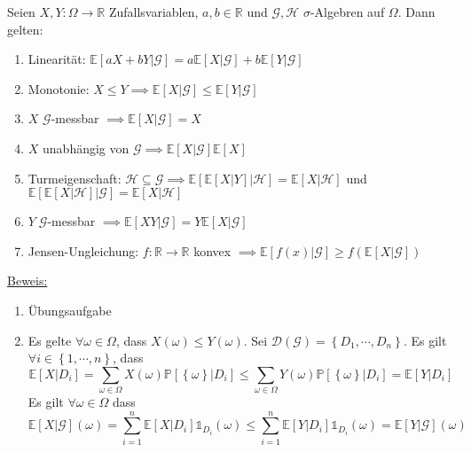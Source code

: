 Seien $ X, Y : \Omega  \to \mathbb{R} $ Zufallsvariablen, $ a,b \in \mathbb{R} $ und $ \mathcal{G}, \mathcal{H}  $ $\sigma$-Algebren auf 
$ \Omega  $. Dann gelten:
\begin{enumerate}[label=\alph*)]
	\item Linearität: $ \mathbb{E} \left[ aX + bY | \mathcal{G} \right] = a \mathbb{E} \left[ X | \mathcal{G} \right] + b \mathbb{E} \left[ Y | \mathcal{G}\right] $ 
	\item Monotonie: $ X \leq Y \implies \mathbb{E} \left[ X | \mathcal{G} \right] \leq \mathbb{E} \left[ Y | \mathcal{G} \right] $ 
	\item $ X  $ $ \mathcal{G}$-messbar $ \implies \mathbb{E} \left[ X | \mathcal{G} \right] = X $  
	\item $ X $ unabhängig von $ \mathcal{G}  \implies \mathbb{E} \left[ X  | \mathcal{G} \right] \mathbb{E} \left[ X \right]$ 
	\item Turmeigenschaft: $ \mathcal{H} \subseteq \mathcal{G} \implies \mathbb{E} \left[ \mathbb{E} \left[ X | Y \right] | \mathcal{H} \right] = \mathbb{E} \left[ X | \mathcal{H} \right] $ und $ \mathbb{E} \left[ \mathbb{E} \left[ X | \mathcal{H} \right]| \mathcal{G} \right] = \mathbb{E} \left[ X | \mathcal{H} \right] $ 
	\item $ Y \; \mathcal{G}$-messbar $ \implies \mathbb{E} \left[ X Y | \mathcal{G} \right] = Y \mathbb{E} \left[ X | \mathcal{G} \right] $
	\item Jensen-Ungleichung: $ f : \mathbb{R} \to \mathbb{R}  $ konvex $ \implies \mathbb{E} \left[ f (x) | \mathcal{G} \right] \geq 
		f \left( \mathbb{E} \left[ X | \mathcal{G} \right] \right)$ 
\end{enumerate}

\underline{Beweis:} \begin{enumerate}[label=\alph*)]
	\item Übungsaufgabe
	\item Es gelte $ \forall \omega  \in \Omega  $, dass $ X (\omega) \leq Y (\omega) $. Sei $ \mathcal{D} (\mathcal{G}) =  \left\{ D_1 , \cdots,  D_n \right\}$. Es gilt $ \forall i \in \left\{ 1 , \cdots,  n \right\} $, dass 
		$$ \mathbb{E} \left[ X | D_i \right] = \sum_{\omega  \in \Omega } X (\omega) \mathbb{P} \left[ \left\{ \omega  \right\} | D_i \right] \leq \sum_{\omega  \in \Omega } Y (\omega) \mathbb{P} \left[ \left\{ \omega  \right\} | D_i \right] = \mathbb{E} \left[ Y | D_i \right] $$
Es gilt $ \forall \omega  \in \Omega  $ dass
$$ \mathbb{E} \left[ X | \mathcal{G} \right] (\omega) = \sum_{i=1}^{n} \mathbb{E} \left[ X | D_i \right] \mathbb{1}_{D_i} (\omega) \leq \sum_{i=1}^{n} \mathbb{E} \left[ Y | D_i \right] \mathbb{1}_{D_i} (\omega) = \mathbb{E} \left[ Y | \mathcal{G} \right] (\omega)$$
\end{enumerate}

